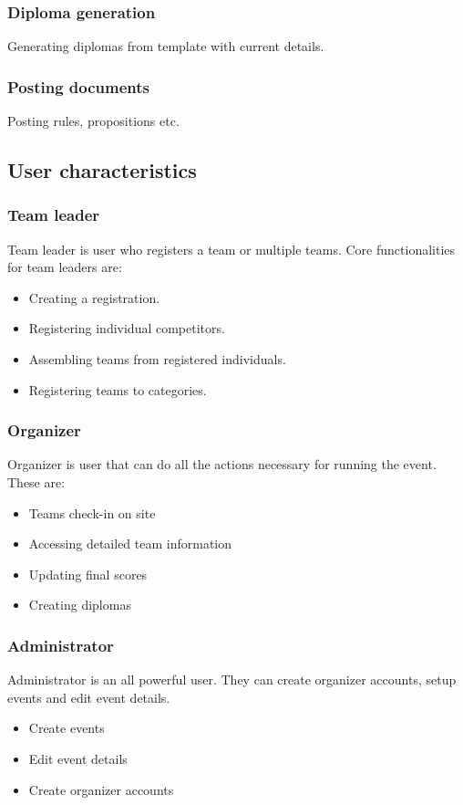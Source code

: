 \documentclass[a4paper]{article}
\begin{document}
	\subsubsection{Diploma generation}
	Generating diplomas from template with current details.
	\subsubsection{Posting documents}
	Posting rules, propositions etc.
	\subsection{User characteristics}
	\label{sub:users}
	\subsubsection{Team leader}
	Team leader is user who registers a team or multiple teams. Core functionalities for team leaders are:
	\begin{itemize}
		\item Creating a registration.
		\item Registering individual competitors.
		\item Assembling teams from registered individuals.
		\item Registering teams to categories. 
	\end{itemize} 

	\subsubsection{Organizer}
	Organizer is user that can do all the actions necessary for running the event. These are:
	\begin{itemize}
		\item Teams check-in on site
		\item Accessing detailed team information
		\item Updating final scores
		\item Creating diplomas
	\end{itemize}

	\subsubsection{Administrator}
	Administrator is an all powerful user. They can create organizer accounts, setup events and edit event details.
	\begin{itemize}
		\item Create events
		\item Edit event details
		\item Create organizer accounts
	\end{itemize}
\end{document}
